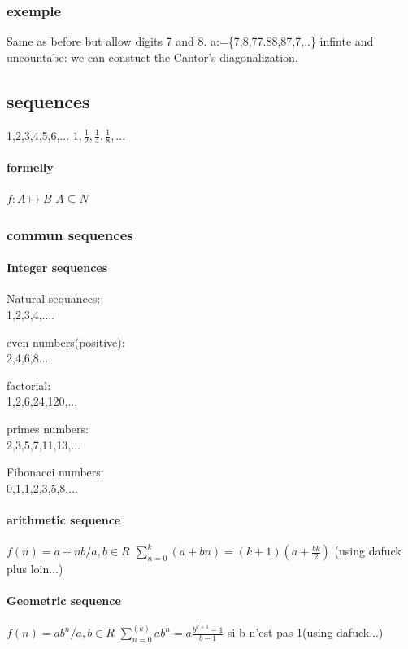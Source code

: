 \documentclass[a4paper,10pt]{article}
\begin{document}
{\subsubsection{exemple}
Same as before but allow digits 7 and 8.
\newline
a:=\{7,8,77.88,87,7,..\}
\newline
infinte and uncountabe: we can constuct the Cantor's diagonalization.
\subsection{sequences}
1,2,3,4,5,6,...
\newline
$1,\frac{1}{2},\frac{1}{4},\frac{1}{8},...$
\paragraph{formelly}
$f:A\mapsto B$
\newline
$A\subseteq N$
\subsubsection{commun sequences}
\paragraph{Integer sequences}
\begin{description}
 \item Natural sequances:\\{1,2,3,4,....}
 \item even numbers(positive):\\{2,4,6,8....}
 \item factorial:\\{1,2,6,24,120,...}
 \item primes numbers:\\{2,3,5,7,11,13,...}
 \item Fibonacci numbers:\\{0,1,1,2,3,5,8,...}
\end{description}
\paragraph{arithmetic sequence}
$f(n)=a+nb/a,b\in R$
\newline
$\sum_{n=0}^{k}(a+bn)=(k+1)(a+\frac{bk}{2})$ (using dafuck plus loin...)
\paragraph{Geometric sequence}
$f(n)=ab^n/a,b\in R$
\newline
$\sum_{n=0}^(k)ab^n=a\frac{b^{k+1}-1}{b-1}$ si b n'est pas 1(using dafuck...)
}
\end{document}
